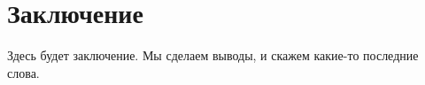 \section*{Заключение}

Здесь будет заключение. Мы сделаем выводы, и скажем какие-то последние слова.
